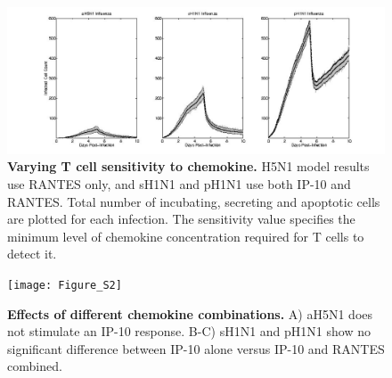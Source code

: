 \documentclass[10pt]{article}
\begin{document}
\begin{figure}[!ht]
\begin{center}
 \includegraphics[width=\textwidth]{Figure_S1}
 \end{center}
\caption{{\bf Varying T cell sensitivity to chemokine.}  H5N1 model results use RANTES  only, and sH1N1 and pH1N1 use both IP-10 and RANTES. Total number of incubating, secreting and apoptotic cells are plotted for each infection.  The sensitivity value specifies the minimum level of chemokine concentration required for T cells to detect it. } 
 \label{fig:sensitivity}
\end{figure}


\begin{figure}[ht!]
\begin{center}
	\texttt{[image: Figure\_S2]}
	\caption{\textbf{Effects of different chemokine combinations.}  A) aH5N1 does not stimulate an IP-10 response.  B-C) sH1N1 and pH1N1 show no significant difference between IP-10 alone versus IP-10 and RANTES combined.}
	\label{fig:chemokine}
\end{center}
\end{figure}
\end{document}
